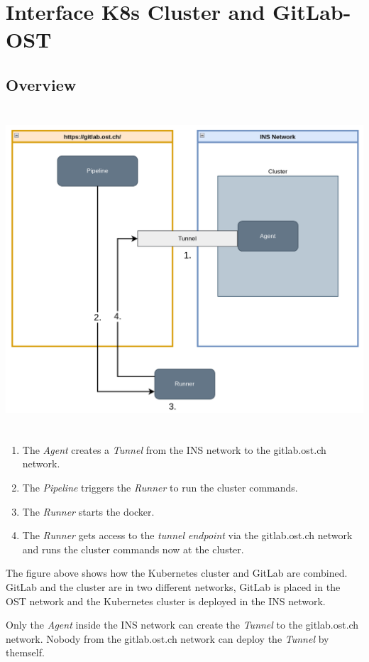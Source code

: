 \chapter{Interface K8s Cluster and GitLab-OST}

\section{Overview}
\includegraphics[height=12cm]{resources/k8s_including_in_gitlab-ost.png}
\begin{enumerate}
    \item The \textit{Agent} creates a \textit{Tunnel} from the INS network to the gitlab.ost.ch network.
    \item The \textit{Pipeline} triggers the \textit{Runner} to run the cluster commands.
    \item The \textit{Runner} starts the docker.
    \item The \textit{Runner} gets access to the \textit{tunnel endpoint} via the gitlab.ost.ch network and runs the cluster commands now at the cluster.
\end{enumerate}

\noindent The figure above shows how the Kubernetes cluster and GitLab are combined. GitLab and the cluster are in two different networks, GitLab is placed in the OST network and the Kubernetes cluster is deployed in the INS network.

Only the \textit{Agent} inside the INS network can create the \textit{Tunnel} to the gitlab.ost.ch network. Nobody from the gitlab.ost.ch network can deploy the \textit{Tunnel} by themself.

